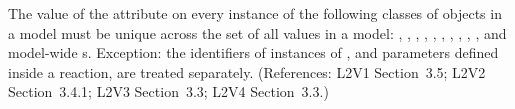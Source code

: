 The value of the  attribute on every instance of the
following classes of objects in a model must be unique
across the set of all  values in a model: \Model,
\FunctionDefinition, \CompartmentType, \SpeciesType,
\Compartment, \Species, \Reaction, \SpeciesReference,
\ModifierSpeciesReference, \Event, and model-wide \Parameter{}s.
Exception: the identifiers of instances of \UnitDefinition, and parameters defined
inside a reaction, are treated separately.  (References: L2V1
Section~3.5; L2V2 Section~3.4.1; L2V3 Section~3.3; L2V4 Section~3.3.)
